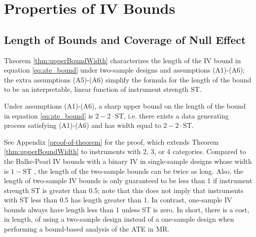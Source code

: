 \documentclass[AMA,STIX1COL,]{WileyNJD-v2}
\begin{document}
\hypertarget{properties-of-iv-bounds}{%
\section{Properties of IV Bounds}\label{properties-of-iv-bounds}}

\label{properties-of-iv-bounds}

\hypertarget{length-of-bounds-and-coverage-of-null-effect}{%
\subsection{Length of Bounds and Coverage of Null
Effect}\label{length-of-bounds-and-coverage-of-null-effect}}

\label{bounds-from-bivariate-data}
\label{properties-of-bounds-from-summary-level-data}

Theorem \ref{thm:upperBoundWidth} characterizes the length of the IV
bound in equation \eqref{eq:ate_bound} under two-sample designs and
assumptions (A1)-(A6); the extra assumptions (A5)-(A6) simplify the
formula for the length of the bound to be an interpretable, linear
function of instrument strength ST.

\begin{theorem}
\label{thm:upperBoundWidth}
Under assumptions (A1)-(A6), a sharp upper bound on the length of the bound in equation \eqref{eq:ate_bound} is $2 - 2\cdot \text{ST}$, i.e. there exists a data generating process satisfying (A1)-(A6) and has width equal to $2 - 2\cdot \text{ST}$.
\end{theorem}

See Appendix \ref{proof-of-theorem} for the proof, which extends Theorem
\ref{thm:upperBoundWidth} to instruments with 2, 3, or 4 categories.
Compared to the Balke-Pearl IV bounds with a binary IV in single-sample
designs whose width is \(1-\text{ST}\) \citep{balke_bounds_1997}, the
length of the two-sample bounds can be twice as long. Also, the length
of two-sample IV bounds is only guaranteed to be less than 1 if
instrument strength ST is greater than 0.5; note that this does not
imply that instruments with ST less than 0.5 has length greater than 1.
In contrast, one-sample IV bounds always have length less than 1 unless
ST is zero. In short, there is a cost, in length, of using a two-sample
design instead of a one-sample design when performing a bound-based
analysis of the ATE in MR.
\end{document}
